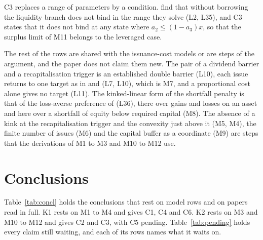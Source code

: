 C3 replaces a range of parameters by a condition. \citet{bayraktar2026} find
that without borrowing the liquidity branch does not bind in the range they
solve (L2, L35), and C3 states that it does not bind at any state where
$a_2\le(1-a_3)x$, so that the surplus limit of M11 belongs to the leveraged
case.

The rest of the rows are shared with the issuance-cost models or are steps of
the argument, and the paper does not claim them new. The pair of a dividend
barrier and a recapitalisation trigger is an established double barrier (L10),
each issue returns
to one target as in \citet{peura2006} and \citet{bolton2011} (L7, L10), which
is M7, and a proportional cost alone gives no target (L11). The kinked-linear
form of the shortfall penalty is that of the loss-averse preference of
\citet{barberis2001} (L36), there over gains and losses on an asset and here
over a shortfall of equity below required capital (M8). The absence of a kink at
the recapitalisation trigger and the convexity just above it (M5, M4), the
finite number of issues (M6) and the capital buffer as a coordinate (M9) are
steps that the derivations of M1 to M3 and M10 to M12 use.

\section{Conclusions}
\label{sec:conclusions}

Table~\ref{tab:concl} holds the conclusions that rest on model rows and on
papers read in full. K1 rests on M1 to M4 and gives C1, C4 and C6. K2 rests
on M3 and M10 to M12 and gives C2 and C3, with C5 pending.
Table~\ref{tab:pending} holds every claim still waiting, and each of its rows
names what it waits on.

